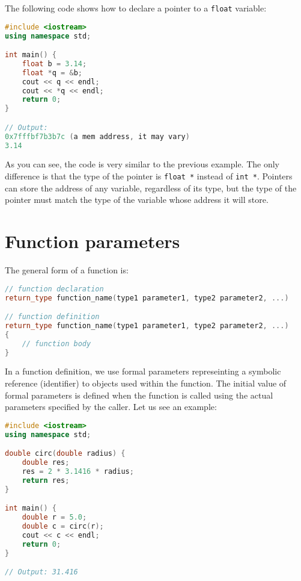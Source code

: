 The following code shows how to declare a pointer to a \texttt{float} variable:

\begin{lstlisting}[language=C++]
#include <iostream>
using namespace std;

int main() {
    float b = 3.14;
    float *q = &b;
    cout << q << endl;
    cout << *q << endl;
    return 0;
}

// Output:
0x7fffbf7b3b7c (a mem address, it may vary)
3.14
\end{lstlisting}

As you can see, the code is very similar to the previous example. The only
difference is that the type of the pointer is \texttt{float *} instead of
\texttt{int *}. Pointers can store the address of any variable, regardless of its
type, but the type of the pointer must match the type of the variable whose
address it will store.\\

\section{Function parameters}

The general form of a function is:

\begin{lstlisting}[language=C++]
// function declaration
return_type function_name(type1 parameter1, type2 parameter2, ...)

// function definition
return_type function_name(type1 parameter1, type2 parameter2, ...)
{
    // function body
}
\end{lstlisting}

In a function definition, we use formal parameters represeinting a symbolic
reference (identifier) to objects used within the function. The initial value of
formal parameters is defined when the function is called using the actual 
parameters specified by the caller. Let us see an example:

\begin{lstlisting}[language=C++]
#include <iostream>
using namespace std;

double circ(double radius) {
    double res;
    res = 2 * 3.1416 * radius;
    return res;
}

int main() {
    double r = 5.0;
    double c = circ(r);
    cout << c << endl;
    return 0;
}

// Output: 31.416
\end{lstlisting}

